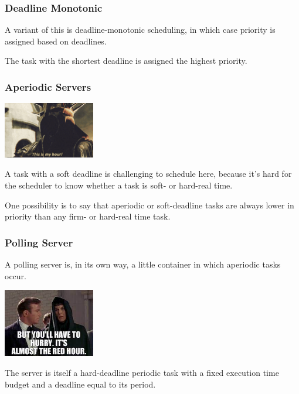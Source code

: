 \begin{frame}
\frametitle{Deadline Monotonic}

A variant of this is deadline-monotonic scheduling, in which case priority is assigned based on deadlines.

The task with the shortest deadline is assigned the highest priority.

\end{frame}

\begin{frame}
\frametitle{Aperiodic Servers}

\begin{center}
	\includegraphics[width=0.3\textwidth]{images/witchking.jpg}
\end{center}

A task with a soft deadline is challenging to schedule here, because it's hard for the scheduler to know whether a task is soft- or hard-real time.

One possibility is to say that aperiodic or soft-deadline tasks are always lower in priority than any firm- or hard-real time task.

\end{frame}

\begin{frame}
\frametitle{Polling Server}

A polling server is, in its own way, a little container in which aperiodic tasks occur.

\begin{center}
	\includegraphics[width=0.3\textwidth]{images/redhour.jpg}
\end{center}

The server is itself a hard-deadline periodic task with a fixed execution time budget and a deadline equal to its period.

\end{frame}

